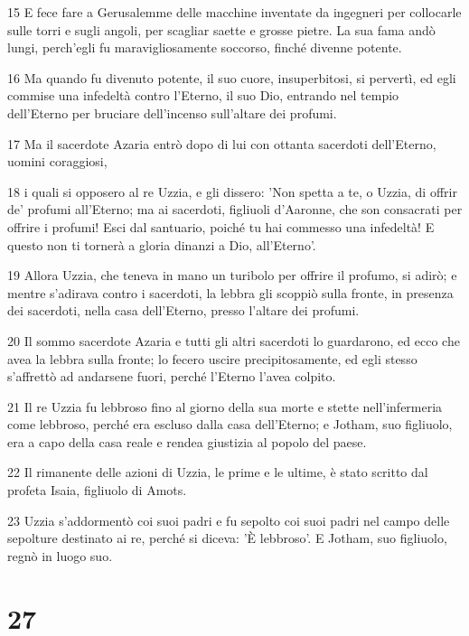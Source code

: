 \par 15 E fece fare a Gerusalemme delle macchine inventate da ingegneri per collocarle sulle torri e sugli angoli, per scagliar saette e grosse pietre. La sua fama andò lungi, perch'egli fu maravigliosamente soccorso, finché divenne potente.
\par 16 Ma quando fu divenuto potente, il suo cuore, insuperbitosi, si pervertì, ed egli commise una infedeltà contro l'Eterno, il suo Dio, entrando nel tempio dell'Eterno per bruciare dell'incenso sull'altare dei profumi.
\par 17 Ma il sacerdote Azaria entrò dopo di lui con ottanta sacerdoti dell'Eterno, uomini coraggiosi,
\par 18 i quali si opposero al re Uzzia, e gli dissero: 'Non spetta a te, o Uzzia, di offrir de' profumi all'Eterno; ma ai sacerdoti, figliuoli d'Aaronne, che son consacrati per offrire i profumi! Esci dal santuario, poiché tu hai commesso una infedeltà! E questo non ti tornerà a gloria dinanzi a Dio, all'Eterno'.
\par 19 Allora Uzzia, che teneva in mano un turibolo per offrire il profumo, si adirò; e mentre s'adirava contro i sacerdoti, la lebbra gli scoppiò sulla fronte, in presenza dei sacerdoti, nella casa dell'Eterno, presso l'altare dei profumi.
\par 20 Il sommo sacerdote Azaria e tutti gli altri sacerdoti lo guardarono, ed ecco che avea la lebbra sulla fronte; lo fecero uscire precipitosamente, ed egli stesso s'affrettò ad andarsene fuori, perché l'Eterno l'avea colpito.
\par 21 Il re Uzzia fu lebbroso fino al giorno della sua morte e stette nell'infermeria come lebbroso, perché era escluso dalla casa dell'Eterno; e Jotham, suo figliuolo, era a capo della casa reale e rendea giustizia al popolo del paese.
\par 22 Il rimanente delle azioni di Uzzia, le prime e le ultime, è stato scritto dal profeta Isaia, figliuolo di Amots.
\par 23 Uzzia s'addormentò coi suoi padri e fu sepolto coi suoi padri nel campo delle sepolture destinato ai re, perché si diceva: 'È lebbroso'. E Jotham, suo figliuolo, regnò in luogo suo.

\chapter{27}

